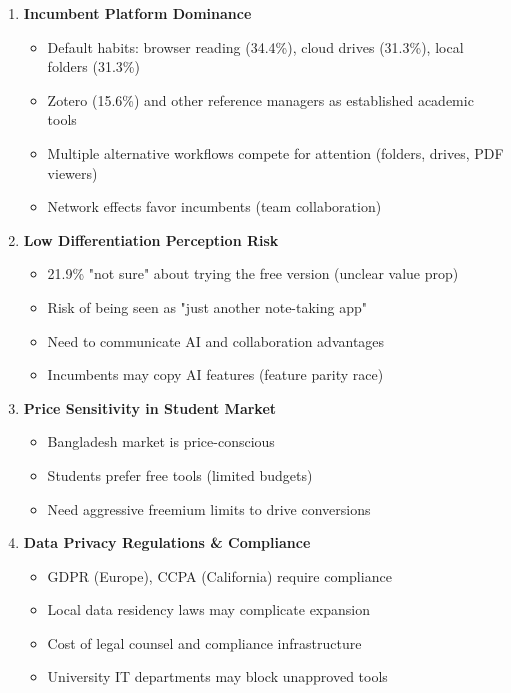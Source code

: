 \begin{enumerate}
    \item \textbf{Incumbent Platform Dominance}
          \begin{itemize}
              \item Default habits: browser reading (34.4\%), cloud drives (31.3\%), local folders (31.3\%)
              \item Zotero (15.6\%) and other reference managers as established academic tools
              \item Multiple alternative workflows compete for attention (folders, drives, PDF viewers)
              \item Network effects favor incumbents (team collaboration)
          \end{itemize}

    \item \textbf{Low Differentiation Perception Risk}
          \begin{itemize}
              \item 21.9\% "not sure" about trying the free version (unclear value prop)
              \item Risk of being seen as "just another note-taking app"
              \item Need to communicate AI and collaboration advantages
              \item Incumbents may copy AI features (feature parity race)
          \end{itemize}

    \item \textbf{Price Sensitivity in Student Market}
          \begin{itemize}
              \item Bangladesh market is price-conscious
              \item Students prefer free tools (limited budgets)
              \item Need aggressive freemium limits to drive conversions
          \end{itemize}

    \item \textbf{Data Privacy Regulations \& Compliance}
          \begin{itemize}
              \item GDPR (Europe), CCPA (California) require compliance
              \item Local data residency laws may complicate expansion
              \item Cost of legal counsel and compliance infrastructure
              \item University IT departments may block unapproved tools
          \end{itemize}


\end{enumerate}
